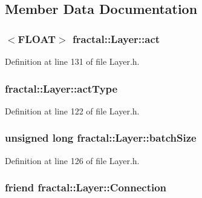\subsection{Member Data Documentation}
\hypertarget{classfractal_1_1Layer_ab25f2b99a417bff762f544adf1efb08c}{
\subsubsection[{act}]{$<${\bf F\+L\+O\+A\+T}$>$ fractal\+::\+Layer\+::act\hspace{0.3cm}{\ttfamily [protected]}}}\label{classfractal_1_1Layer_ab25f2b99a417bff762f544adf1efb08c}


Definition at line 131 of file Layer.\+h.

\hypertarget{classfractal_1_1Layer_a042deda27b82d3ff498bb5f9c4bbf115}{
\subsubsection[{act\+Type}]{ fractal\+::\+Layer\+::act\+Type\hspace{0.3cm}{\ttfamily [protected]}}}\label{classfractal_1_1Layer_a042deda27b82d3ff498bb5f9c4bbf115}


Definition at line 122 of file Layer.\+h.

\hypertarget{classfractal_1_1Layer_ab1bc36200fdb731ad1142d1dc96a6031}{
\subsubsection[{batch\+Size}]{\setlength{\rightskip}{0pt plus 5cm}unsigned long fractal\+::\+Layer\+::batch\+Size\hspace{0.3cm}{\ttfamily [protected]}}}\label{classfractal_1_1Layer_ab1bc36200fdb731ad1142d1dc96a6031}


Definition at line 126 of file Layer.\+h.

\hypertarget{classfractal_1_1Layer_a462ead8af5a9f5acfc359a348488b87f}{
\subsubsection[{Connection}]{\setlength{\rightskip}{0pt plus 5cm}friend fractal\+::\+Layer\+::\+Connection\hspace{0.3cm}{\ttfamily [protected]}}}\label{classfractal_1_1Layer_a462ead8af5a9f5acfc359a348488b87f}


